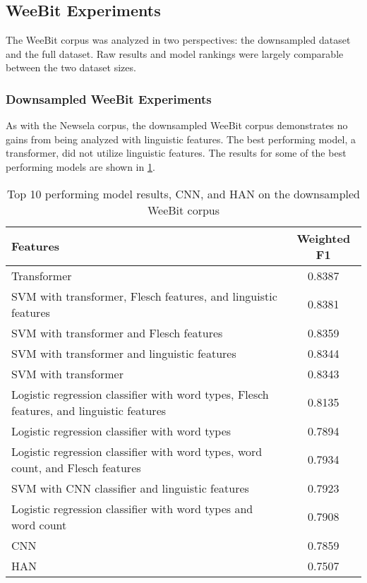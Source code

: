 \documentclass[11pt,a4paper]{article}
\theoremstyle{definition}
\begin{document}
\subsection{WeeBit Experiments}

The WeeBit corpus was analyzed in two perspectives: the downsampled dataset and the full dataset. Raw results and model rankings were largely comparable between the two dataset sizes. 

\subsubsection{Downsampled WeeBit Experiments}

As with the Newsela corpus, the downsampled WeeBit corpus demonstrates no gains from being analyzed with linguistic features. The best performing model, a transformer, did not utilize linguistic features. The results for some of the best performing models are shown in \cref{tab:weebitBest}. 

\begin{table}
\begin{tabular}{p{5cm}c}
Features & Weighted F1\\
\hline
\rowcolor{transformer} Transformer & 0.8387 \\
\rowcolor{transformer} SVM with transformer, Flesch features, and linguistic features & 0.8381 \\
\rowcolor{transformer} SVM with transformer and Flesch features & 0.8359 \\
\rowcolor{transformer} SVM with transformer and linguistic features & 0.8344 \\
\rowcolor{transformer} SVM with transformer & 0.8343 \\
\rowcolor{nondeep} Logistic regression classifier with word types, Flesch features, and linguistic features & 0.8135 \\
\rowcolor{nondeep} Logistic regression classifier with word types & 0.7894 \\
\rowcolor{nondeep} Logistic regression classifier with word types, word count, and Flesch features & 0.7934 \\
\rowcolor{cnn} SVM with CNN classifier and linguistic features & 0.7923 \\
\rowcolor{nondeep} Logistic regression classifier with word types and word count & 0.7908 \\\hline\hline
\rowcolor{cnn} CNN & 0.7859 \\
\rowcolor{han} HAN & 0.7507 \\
\end{tabular}
    \caption{Top 10 performing model results, CNN, and HAN on the downsampled WeeBit corpus}
    \label{tab:weebitBest}
\end{table}
\end{document}
